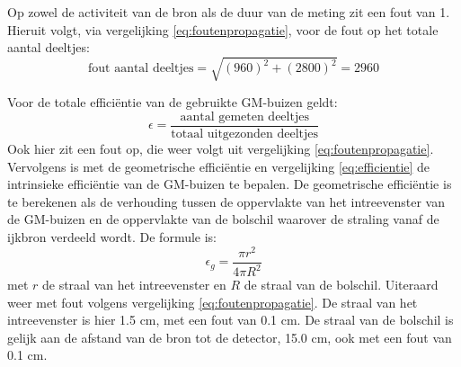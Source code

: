 \documentclass[11pt,a4paper]{article}
\begin{document}
Op zowel de activiteit van de bron als de duur van de meting zit een fout van 1. Hieruit volgt, via vergelijking \ref{eq:foutenpropagatie}, voor de fout op het totale aantal deeltjes:
\begin{equation}
\text{fout aantal deeltjes} = \sqrt{\left(960\right)^2 + \left(2800\right)^2} = 2960
\end{equation}

Voor de totale efficiëntie van de gebruikte GM-buizen geldt:
\begin{equation}
\epsilon = \frac{\text{aantal gemeten deeltjes}}{\text{totaal uitgezonden deeltjes}}
\label{eq:efficientie_GM}
\end{equation}
Ook hier zit een fout op, die weer volgt uit vergelijking \ref{eq:foutenpropagatie}. Vervolgens is met de geometrische efficiëntie en vergelijking \ref{eq:efficientie} de intrinsieke efficiëntie van de GM-buizen te bepalen. De geometrische efficiëntie is te berekenen als de verhouding tussen de oppervlakte van het intreevenster van de GM-buizen en de oppervlakte van de bolschil waarover de straling vanaf de ijkbron verdeeld wordt. De formule is:
\begin{equation}
\epsilon_g = \frac{\pi r^2}{4\pi R^2}
\label{eq:geometrisch}
\end{equation}
met $r$ de straal van het intreevenster en $R$ de straal van de bolschil. Uiteraard weer met fout volgens vergelijking \ref{eq:foutenpropagatie}. De straal van het intreevenster is hier 1.5 cm, met een fout van 0.1 cm. De straal van de bolschil is gelijk aan de afstand van de bron tot de detector, 15.0 cm, ook met een fout van 0.1 cm.
\end{document}
